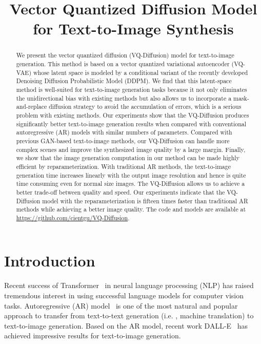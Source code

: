 \title{Vector Quantized Diffusion Model for Text-to-Image Synthesis}

\begin{abstract}
We present the vector quantized diffusion (VQ-Diffusion) model for text-to-image generation. This method is based on a vector quantized variational autoencoder (VQ-VAE) whose latent space is modeled by a conditional variant of the recently developed Denoising Diffusion Probabilistic Model (DDPM). We find that this latent-space method is well-suited for text-to-image generation tasks because it not only eliminates the unidirectional bias with existing methods but also allows us to incorporate a mask-and-replace diffusion strategy to avoid the accumulation of errors, which is a serious problem with existing methods. Our experiments show that the VQ-Diffusion produces significantly better text-to-image generation results when compared with conventional autoregressive (AR) models with similar numbers of parameters. Compared with previous GAN-based text-to-image methods, our VQ-Diffusion can handle more complex scenes and improve the synthesized image quality by a large margin. Finally, we show that the image generation computation in our method can be made highly efficient by reparameterization. With traditional AR methods, the text-to-image generation time increases linearly with the output image resolution and hence is quite time consuming even for normal size images. The VQ-Diffusion allows us to achieve a better trade-off between quality and speed. Our experiments indicate that the VQ-Diffusion model with the reparameterization is fifteen times faster than traditional AR methods while achieving a better image quality. The code and models are available at \url{https://github.com/cientgu/VQ-Diffusion}.
\end{abstract}

\section{Introduction}

Recent success of Transformer~\cite{vaswani2017attention, devlin2018bert} in neural language processing (NLP) has raised tremendous interest in using successful language models for computer vision tasks. Autoregressive (AR) model~\cite{radford2018improving,radford2019language,brown2020language} is one of the most natural and popular approach to transfer from text-to-text generation (i.e. , machine translation) to text-to-image generation. Based on the AR model, recent work DALL-E~\cite{ramesh2021zero} has achieved impressive results for text-to-image generation.

